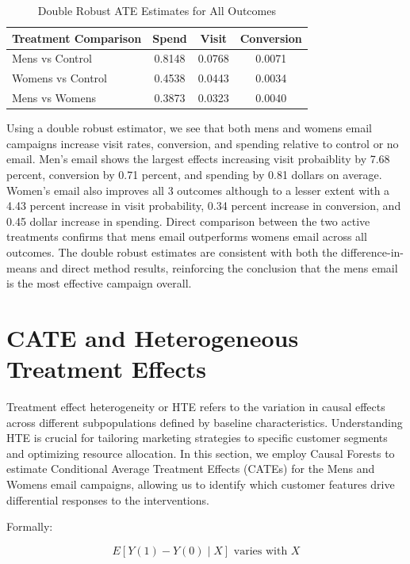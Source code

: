 \documentclass[10pt]{article}
\begin{document}
\begin{table}[H]
\centering
\caption{Double Robust ATE Estimates for All Outcomes}
\label{tab:dr_results}
\begin{tabular}{lccc}
\toprule
\textbf{Treatment Comparison} & \textbf{Spend} & \textbf{Visit} & \textbf{Conversion} \\
\midrule
Mens vs Control   & 0.8148 & 0.0768 & 0.0071 \\
Womens vs Control & 0.4538 & 0.0443 & 0.0034 \\
Mens vs Womens    & 0.3873 & 0.0323 & 0.0040 \\
\bottomrule
\end{tabular}
\end{table}


Using a double robust estimator, we see that both mens and womens email campaigns increase visit rates, conversion, and spending relative to control or no email. Men's email shows the largest effects increasing visit probaiblity by 7.68 percent, conversion by 0.71 percent, and spending by 0.81 dollars on average. Women's email also improves all 3 outcomes although to a lesser extent with a 4.43 percent increase in visit probability, 0.34 percent increase in conversion, and 0.45 dollar increase in spending. Direct comparison between the two active treatments confirms that mens email outperforms womens email across all outcomes. The double robust estimates are consistent with both the difference-in-means and direct method results, reinforcing the conclusion that the mens email is the most effective campaign overall.

\section{CATE and Heterogeneous Treatment Effects}

Treatment effect heterogeneity or HTE refers to the variation in causal effects across different subpopulations defined by baseline characteristics. Understanding HTE is crucial for tailoring marketing strategies to specific customer segments and optimizing resource allocation. In this section, we employ Causal Forests to estimate Conditional Average Treatment Effects (CATEs) for the Mens and Womens email campaigns, allowing us to identify which customer features drive differential responses to the interventions.

Formally: 

\[
E[Y(1) - Y(0) \mid X] \text{ varies with } X
\]
\end{document}
